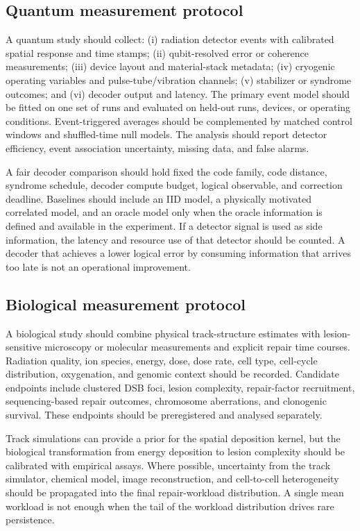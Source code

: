\documentclass[11pt,a4paper,oneside]{article}
\begin{document}
\subsection{Quantum measurement protocol}
A quantum study should collect: (i) radiation detector events with calibrated spatial response and time stamps; (ii) qubit-resolved error or coherence measurements; (iii) device layout and material-stack metadata; (iv) cryogenic operating variables and pulse-tube/vibration channels; (v) stabilizer or syndrome outcomes; and (vi) decoder output and latency. The primary event model should be fitted on one set of runs and evaluated on held-out runs, devices, or operating conditions. Event-triggered averages should be complemented by matched control windows and shuffled-time null models. The analysis should report detector efficiency, event association uncertainty, missing data, and false alarms.

A fair decoder comparison should hold fixed the code family, code distance, syndrome schedule, decoder compute budget, logical observable, and correction deadline. Baselines should include an IID model, a physically motivated correlated model, and an oracle model only when the oracle information is defined and available in the experiment. If a detector signal is used as side information, the latency and resource use of that detector should be counted. A decoder that achieves a lower logical error by consuming information that arrives too late is not an operational improvement.

\subsection{Biological measurement protocol}
A biological study should combine physical track-structure estimates with lesion-sensitive microscopy or molecular measurements and explicit repair time courses. Radiation quality, ion species, energy, dose, dose rate, cell type, cell-cycle distribution, oxygenation, and genomic context should be recorded. Candidate endpoints include clustered DSB foci, lesion complexity, repair-factor recruitment, sequencing-based repair outcomes, chromosome aberrations, and clonogenic survival. These endpoints should be preregistered and analysed separately.

Track simulations can provide a prior for the spatial deposition kernel, but the biological transformation from energy deposition to lesion complexity should be calibrated with empirical assays. Where possible, uncertainty from the track simulator, chemical model, image reconstruction, and cell-to-cell heterogeneity should be propagated into the final repair-workload distribution. A single mean workload is not enough when the tail of the workload distribution drives rare persistence.
\end{document}
